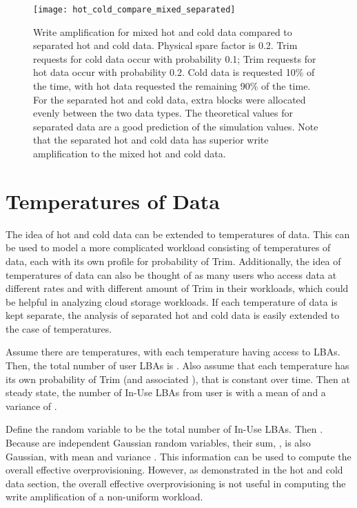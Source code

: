\documentclass[prodmode,acmtos]{acmsmall}
\begin{document}
\begin{figure}
\centerline{\texttt{[image: hot\_cold\_compare\_mixed\_separated]}}
\caption{Write amplification for mixed hot and cold data compared to separated hot and cold data.  Physical spare factor is 0.2.  Trim requests for cold data occur with probability 0.1; Trim requests for hot data occur with probability 0.2.  Cold data is requested 10\% of the time, with hot data requested the remaining 90\% of the time.  For the separated hot and cold data, extra blocks were allocated evenly between the two data types.  The theoretical values for separated data are a good prediction of the simulation values.  Note that the separated hot and cold data has superior write amplification to the mixed hot and cold data.}
\label{fig:hot_cold_compare_mixed_separated}
\end{figure}



\section{ Temperatures of Data}
The idea of hot and cold data can be extended to  temperatures of data.  This can be used to model a more complicated workload consisting of  temperatures of data, each with its own profile for probability of Trim.  Additionally, the idea of  temperatures of data can also be thought of as many users who access data at different rates and with different amount of Trim in their workloads, which could be helpful in analyzing cloud storage workloads.  If each temperature of data is kept separate, the analysis of separated hot and cold data is easily extended to the case of  temperatures.

Assume there are  temperatures, with each temperature  having access to  LBAs.  Then, the total number of user LBAs is .  Also assume that each temperature has its own probability of Trim  (and associated ), that is constant over time.  Then at steady state, the number of In-Use LBAs from user  is  with a mean of  and a variance of .

Define the random variable  to be the total number of In-Use LBAs.  Then .  Because  are independent Gaussian random variables, their sum, , is also Gaussian, with mean  and variance .  This information can be used to compute the overall effective overprovisioning.  However, as demonstrated in the hot and cold data section, the overall effective overprovisioning is not useful in computing the write amplification of a non-uniform workload.
\end{document}
